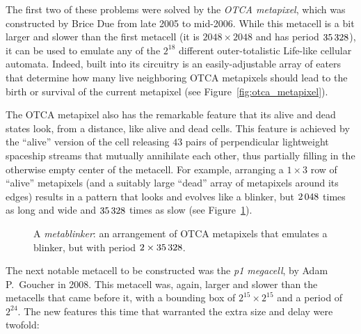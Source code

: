 The first two of these problems were solved by the \emph{OTCA metapixel}, which was constructed by Brice Due from late 2005 to mid-2006. While this metacell is a bit larger and slower than the first metacell (it is $2048 \times 2048$ and has period $35{\,}328$), it can be used to emulate any of the $2^{18}$ different outer-totalistic Life-like cellular automata. Indeed, built into its circuitry is an easily-adjustable array of eaters that determine how many live neighboring OTCA metapixels should lead to the birth or survival of the current metapixel (see Figure~\ref{fig:otca_metapixel}). 


The OTCA metapixel also has the remarkable feature that its alive and dead states look, from a distance, like alive and dead cells. This feature is achieved by the ``alive'' version of the cell releasing $43$ pairs of perpendicular lightweight spaceship streams that mutually annihilate each other, thus partially filling in the otherwise empty center of the metacell. For example, arranging a $1 \times 3$ row of ``alive'' metapixels (and a suitably large ``dead'' array of metapixels around its edges) results in a pattern that looks and evolves like a blinker, but $2{\,}048$ times as long and wide and $35{\,}328$ times as slow (see Figure~\ref{fig:metablinker}).

\begin{figure}[!htb]
	\centering
	\caption{A \emph{metablinker}: an arrangement of OTCA metapixels that emulates a blinker, but with period $2 \times 35{\,}328$.}\label{fig:metablinker}
\end{figure}

The next notable metacell to be constructed was the \emph{p1 megacell}, by Adam P.~Goucher in 2008. This metacell was, again, larger and slower than the metacells that came before it, with a bounding box of $2^{15} \times 2^{15}$ and a period of $2^{24}$. The new features this time that warranted the extra size and delay were twofold:\smallskip

